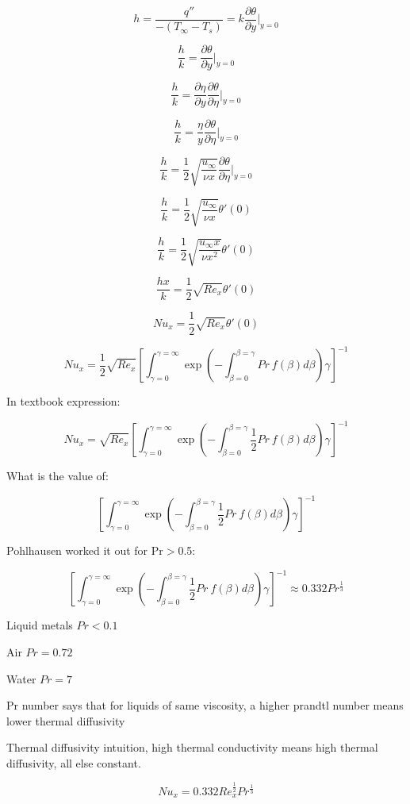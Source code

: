 \documentclass[11pt]{article}
\begin{document}
$$h = \frac{q''}{-(T_\infty-T_s)} = k  \frac{\partial \theta}{\partial y}|_{y=0}$$

$$ \frac{h}{k}=   \frac{\partial \theta}{\partial y}|_{y=0}$$

$$ \frac{h}{k}=  \frac{\partial \eta}{\partial y} \frac{\partial \theta}{\partial \eta}|_{y=0}$$

$$ \frac{h}{k}=  \frac{ \eta}{ y} \frac{\partial \theta}{\partial \eta}|_{y=0}$$


$$ \frac{h}{k}=  \frac{1}{2} \sqrt{\frac{u_\infty}{\nu x}} \frac{\partial \theta}{\partial \eta}|_{y=0}$$


$$ \frac{h}{k}=  \frac{1}{2} \sqrt{\frac{u_\infty}{\nu x}} \theta' (0)$$

$$ \frac{h}{k}=  \frac{1}{2} \sqrt{\frac{u_\infty x}{\nu x^2}} \theta' (0)$$


$$ \frac{h x}{k}=  \frac{1}{2} \sqrt{Re_x} \theta' (0)$$

$$ Nu_x=  \frac{1}{2} \sqrt{Re_x} \theta' (0)$$

$$Nu_x = \frac{1}{2} \sqrt{Re_x}  \left[ \int_{\gamma=0}^{\gamma=\infty}  \exp ( -  \int_{\beta=0}^{\beta=\gamma}  Pr \ f (\beta) d\beta) \gamma \right] ^{-1}$$

In textbook expression:

$$Nu_x =\sqrt{Re_x}  \left[ \int_{\gamma=0}^{\gamma=\infty}  \exp ( -  \int_{\beta=0}^{\beta=\gamma}  \frac{1}{2}  Pr \ f (\beta) d\beta) \gamma \right] ^{-1}$$


What is the value of:

$$\left[ \int_{\gamma=0}^{\gamma=\infty}  \exp ( -  \int_{\beta=0}^{\beta=\gamma}  \frac{1}{2}  Pr \ f (\beta) d\beta) \gamma \right] ^{-1}$$

Pohlhausen worked it out for Pr$>$0.5:

$$\left[ \int_{\gamma=0}^{\gamma=\infty}  \exp ( -  \int_{\beta=0}^{\beta=\gamma}  \frac{1}{2}  Pr \ f (\beta) d\beta) \gamma \right] ^{-1} \approx  0.332 Pr^{\frac{1}{3}} $$

Liquid metals $Pr <0.1$

Air $Pr=0.72$

Water $Pr=7$

Pr number says that for liquids of same viscosity, a higher prandtl number means lower  thermal diffusivity

Thermal diffusivity intuition, high thermal conductivity means high thermal diffusivity, all else constant.

$$Nu_x = 0.332 Re_x^{\frac{1}{2}}  Pr^{\frac{1}{3}} $$
\end{document}
